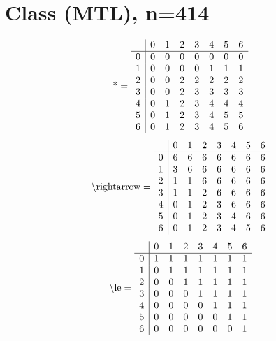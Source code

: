 \documentclass[11pt]{article}
\begin{document}
\section{Class (MTL), n=414}
\[\text{*} = 
\begin{array}{r | r r r r r r r}
 & 0 & 1 & 2 & 3 & 4 & 5 & 6 \\ \hline
0 & 0 & 0 & 0 & 0 & 0 & 0 & 0 \\
1 & 0 & 0 & 0 & 0 & 1 & 1 & 1 \\
2 & 0 & 0 & 2 & 2 & 2 & 2 & 2 \\
3 & 0 & 0 & 2 & 3 & 3 & 3 & 3 \\
4 & 0 & 1 & 2 & 3 & 4 & 4 & 4 \\
5 & 0 & 1 & 2 & 3 & 4 & 5 & 5 \\
6 & 0 & 1 & 2 & 3 & 4 & 5 & 6 \\
\end{array}
\]
\[\text{\textbackslash rightarrow} = 
\begin{array}{r | r r r r r r r}
 & 0 & 1 & 2 & 3 & 4 & 5 & 6 \\ \hline
0 & 6 & 6 & 6 & 6 & 6 & 6 & 6 \\
1 & 3 & 6 & 6 & 6 & 6 & 6 & 6 \\
2 & 1 & 1 & 6 & 6 & 6 & 6 & 6 \\
3 & 1 & 1 & 2 & 6 & 6 & 6 & 6 \\
4 & 0 & 1 & 2 & 3 & 6 & 6 & 6 \\
5 & 0 & 1 & 2 & 3 & 4 & 6 & 6 \\
6 & 0 & 1 & 2 & 3 & 4 & 5 & 6 \\
\end{array}
\]
\[\text{\textbackslash le} = 
\begin{array}{r | r r r r r r r}
 & 0 & 1 & 2 & 3 & 4 & 5 & 6 \\ \hline
0 & 1 & 1 & 1 & 1 & 1 & 1 & 1 \\
1 & 0 & 1 & 1 & 1 & 1 & 1 & 1 \\
2 & 0 & 0 & 1 & 1 & 1 & 1 & 1 \\
3 & 0 & 0 & 0 & 1 & 1 & 1 & 1 \\
4 & 0 & 0 & 0 & 0 & 1 & 1 & 1 \\
5 & 0 & 0 & 0 & 0 & 0 & 1 & 1 \\
6 & 0 & 0 & 0 & 0 & 0 & 0 & 1 \\
\end{array}
\]
\end{document}
